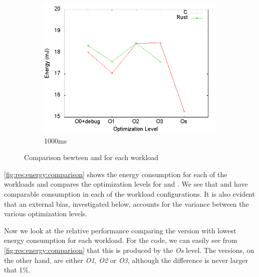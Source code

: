 \begin{figure}[H]
  \begin{subfigure}{0.40\textwidth}
    \includegraphics[width=\textwidth]{results/plots/energy/1000.png}
    \caption{1000ms}
  \end{subfigure}

  \caption{Comparison bewteen {\rust} and {\C} for each workload}
  \label{fig:res:energy:comparison}
\end{figure}

\autoref{fig:res:energy:comparison} shows the energy consumption for each of the workloads and compares the optimization levels for {\rust} and {\C}.
We see that {\rust} and {\C} have comparable consumption in each of the workload configurations.
It is also evident that an external bias, investigated below, accounts for the variance between the various optimization levels.

Now we look at the relative performance comparing the version with lowest energy consumption for each workload.
For the {\C} code, we can easily see from \autoref{fig:res:energy:comparison} that this is produced by the \emph{Os} level.
The {\rust} versions, on the other hand, are either \emph{O1}, \emph{O2} or \emph{O3}, although the difference is never larger that 1\%.

